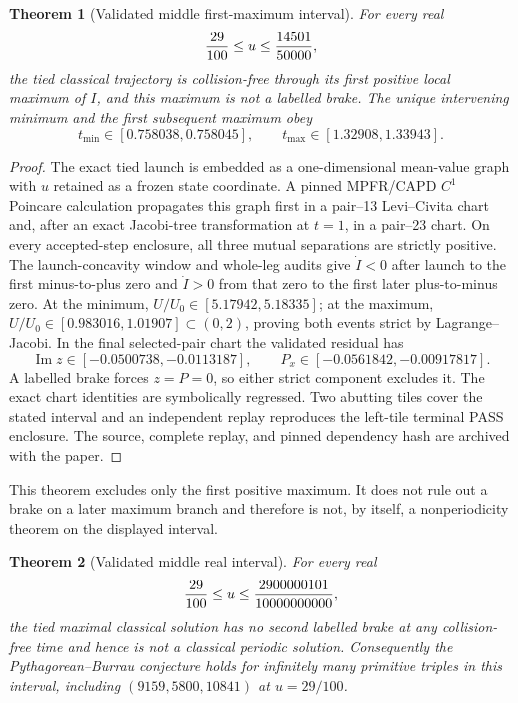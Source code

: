 \documentclass[11pt]{article}
\newtheorem{theorem}{Theorem}
\begin{document}
\begin{theorem}[Validated middle first-maximum interval]
For every real
\[
 {29\over100}\le u\le {14501\over50000},
\]
the tied classical trajectory is collision-free through its first positive
local maximum of $I$, and this maximum is not a labelled brake.  The unique
intervening minimum and the first subsequent maximum obey
\[
 t_{\min}\in[0.758038,0.758045],\qquad
 t_{\max}\in[1.32908,1.33943].
\]
\end{theorem}
\begin{proof}
The exact tied launch is embedded as a one-dimensional mean-value graph with
$u$ retained as a frozen state coordinate.  A pinned MPFR/CAPD $C^1$
Poincare calculation propagates this graph first in a pair--13
Levi--Civita chart and, after an exact Jacobi-tree transformation at $t=1$,
in a pair--23 chart.  On every accepted-step enclosure, all three mutual
separations are strictly positive.  The launch-concavity window and whole-leg audits give $\dot I<0$ after
launch to the first minus-to-plus zero and $\dot I>0$ from that zero to the
first later plus-to-minus zero.  At the minimum,
$U/U_0\in[5.17942,5.18335]$; at the maximum,
$U/U_0\in[0.983016,1.01907]\subset(0,2)$, proving both events strict by
Lagrange--Jacobi.  In the final selected-pair chart the validated residual
has
\[
 \operatorname{Im}z\in[-0.0500738,-0.0113187],\qquad
 P_x\in[-0.0561842,-0.00917817].
\]
A labelled brake forces $z=P=0$, so either strict component excludes it.
The exact chart identities are symbolically regressed.  Two abutting tiles
cover the stated interval and an independent replay reproduces the left-tile
terminal PASS enclosure.  The source,
complete replay, and pinned dependency hash are archived with the paper.
\end{proof}

This theorem excludes only the first positive maximum.  It does not rule out
a brake on a later maximum branch and therefore is not, by itself, a
nonperiodicity theorem on the displayed interval.

\begin{theorem}[Validated middle real interval]
For every real
\[
 {29\over100}\le u\le {2900000101\over10000000000},
\]
the tied maximal classical solution has no second labelled brake at any
collision-free time and hence is not a classical periodic solution.
Consequently the Pythagorean--Burrau conjecture holds for infinitely many
primitive triples in this interval, including
$(9159,5800,10841)$ at $u=29/100$.
\end{theorem}
\end{document}
